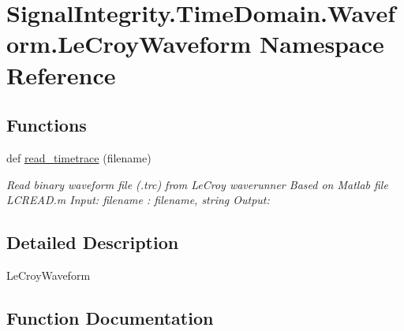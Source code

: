 \hypertarget{namespaceSignalIntegrity_1_1TimeDomain_1_1Waveform_1_1LeCroyWaveform}{}\section{Signal\+Integrity.\+Time\+Domain.\+Waveform.\+Le\+Croy\+Waveform Namespace Reference}
\label{namespaceSignalIntegrity_1_1TimeDomain_1_1Waveform_1_1LeCroyWaveform}
\subsection*{Functions}
\begin{DoxyCompactItemize}
\item 
def \hyperlink{namespaceSignalIntegrity_1_1TimeDomain_1_1Waveform_1_1LeCroyWaveform_a77d9a2945956b500827092ec40079e1e}{read\+\_\+timetrace} (filename)
\begin{DoxyCompactList}\small\item\em Read binary waveform file (.trc) from Le\+Croy waverunner Based on Matlab file L\+C\+R\+E\+A\+D.\+m Input\+: filename \+: filename, string Output\+: \end{DoxyCompactList}\end{DoxyCompactItemize}


\subsection{Detailed Description}
\begin{DoxyVerb}LeCroyWaveform\end{DoxyVerb}
 

\subsection{Function Documentation}
\mbox{\label{namespaceSignalIntegrity_1_1TimeDomain_1_1Waveform_1_1LeCroyWaveform_a77d9a2945956b500827092ec40079e1e}} 
